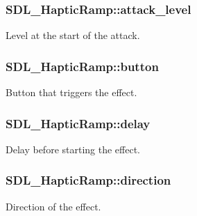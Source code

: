 \subsubsection[{\texorpdfstring{attack\+\_\+level}{attack_level}}]{ S\+D\+L\+\_\+\+Haptic\+Ramp\+::attack\+\_\+level}\hypertarget{struct_s_d_l___haptic_ramp_a755933bbda14ae9b53c574b9fe6291a0}{}\label{struct_s_d_l___haptic_ramp_a755933bbda14ae9b53c574b9fe6291a0}
Level at the start of the attack. 
\subsubsection[{\texorpdfstring{button}{button}}]{ S\+D\+L\+\_\+\+Haptic\+Ramp\+::button}\hypertarget{struct_s_d_l___haptic_ramp_a2027c6fd88f1ebe652c90c71410ee0bf}{}\label{struct_s_d_l___haptic_ramp_a2027c6fd88f1ebe652c90c71410ee0bf}
Button that triggers the effect. 
\subsubsection[{\texorpdfstring{delay}{delay}}]{ S\+D\+L\+\_\+\+Haptic\+Ramp\+::delay}\hypertarget{struct_s_d_l___haptic_ramp_ac9471016f41919b4a1c786bbd649a777}{}\label{struct_s_d_l___haptic_ramp_ac9471016f41919b4a1c786bbd649a777}
Delay before starting the effect. 
\subsubsection[{\texorpdfstring{direction}{direction}}]{ S\+D\+L\+\_\+\+Haptic\+Ramp\+::direction}\hypertarget{struct_s_d_l___haptic_ramp_a6fb6c67ccf262b8f3ec08bcdf08f9965}{}\label{struct_s_d_l___haptic_ramp_a6fb6c67ccf262b8f3ec08bcdf08f9965}
Direction of the effect. 

